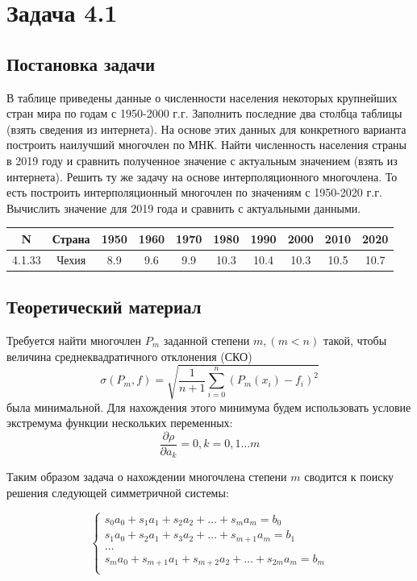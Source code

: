 \section*{Задача 4.1}
\subsection*{Постановка задачи}
В таблице приведены данные о численности населения некоторых
крупнейших стран мира по годам с 1950-2000 г.г. Заполнить последние два столбца
таблицы (взять сведения из интернета). На основе этих данных для конкретного варианта
построить наилучший многочлен по МНК. Найти численность населения страны в 2019
году и сравнить полученное значение с актуальным значением (взять из интернета).
Решить ту же задачу на основе интерполяционного многочлена. То есть построить
интерполяционный многочлен по значениям с 1950-2020 г.г. Вычислить значение для
2019 года и сравнить с актуальными данными.

\begin{tabular}{| c | c | c | c | c | c | c | c | c | c |}
	\hline
	N & Страна & 1950 & 1960 & 1970 & 1980 & 1990 & 2000 & 2010 & 2020 \\ \hline
	4.1.33 & Чехия & 8.9 & 9.6 & 9.9 & 10.3 & 10.4 & 10.3 & 10.5 & 10.7 \\ \hline
\end{tabular}

\subsection*{Теоретический материал}

Требуется найти многочлен $P_m$ заданной степени $m, (m < n)$ такой, чтобы величина
среднеквадратичного отклонения (СКО)
\[
	\sigma(P_m, f) = \sqrt{\dfrac{1}{n + 1}\sum\limits_{i=0}^n(P_m(x_i) - f_i)^2}
\]
была минимальной. Для нахождения этого минимума будем использовать условие экстремума функции нескольких переменных:
\[
	\dfrac{\partial \rho}{\partial a_k} = 0, k = 0,1 \dots m
\]

Таким образом задача о нахождении многочлена  степени $m$ сводится к поиску решения следующей симметричной системы:

\[
	\begin{cases}
		s_0a_0 + s_1a_1 + s_2a_2 + \dots + s_ma_m = b_0 \\
		s_1a_0 + s_2a_1 + s_3a_2 + \dots + s_{m+1}a_m = b_1 \\
		\dots \\
		s_ma_0 + s_{m+1}a_1 + s_{m+2}a_2 + \dots + s_{2m}a_m = b_m \\
	\end{cases}
\]

